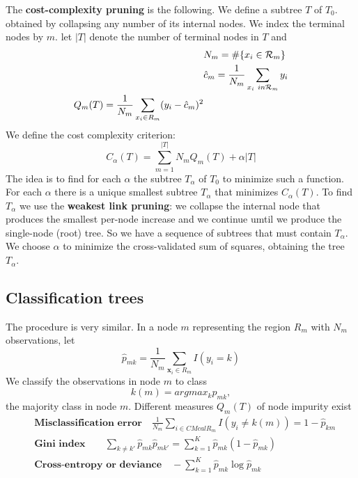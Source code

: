 \documentclass[12pt, letterpaper]{article}
\theoremstyle{definition}
\newcommand{\x}{\mathbf{x}}
\begin{document}
The \textbf{cost-complexity pruning} is the following. We define a subtree $T$ of $T_0$. obtained by collapsing any number of its internal nodes. We index the terminal nodes by $m$. let $|T|$ denote the number of terminal nodes in $T$ and 
\begin{equation}
\begin{aligned}
&N_m = \#\{x_i \in \CMcal{R}_m\}\\
&\hat{c}_m = \frac{1}{N_m} \sum_{x_i \ in \CMcal{R}_m} y_i\\
Q_m(T) = \frac{1}{N_m} \sum_{x_i \in R_m}(y_i - \hat{c}_m)^2
\end{aligned}
\end{equation} 
We define the cost complexity criterion:
\begin{equation}
C_\alpha (T) = \sum_{m=1}^{|T|} N_m Q_m(T) + \alpha |T|
\end{equation}
The idea is to find for each $\alpha$ the subtree $T_\alpha$ of $T_0$ to minimize such a function.
For each $\alpha$ there is a unique smallest subtree $T_\alpha$ that minimizes $C_\alpha(T)$. To find $T_\alpha$ we use the \textbf{weakest link pruning}: we collapse the internal node that produces the smallest per-node increase and we continue umtil we produce the single-node (root) tree. So we have a sequence of subtrees that must contain $T_\alpha$. We choose $\alpha$ to minimize the cross-validated sum of squares, obtaining the tree $T_\alpha$.

\subsection{Classification trees}
The procedure is very similar. In a node $m$ representing the region $R_m$ with $N_m$ observations, let 
\begin{equation}
\hat{p}_{mk} = \frac{1}{N_m}\sum_{\x_i\in R_m} I(y_i=k)
\end{equation}
We classify the observations in node $m$ to class
\begin{equation}
k(m) =argmax_k \hat{p}_{mk},
\end{equation}
the majority class in node $m$. Different measures $Q_m(T)$ of node impurity exist
\begin{equation}
\begin{aligned}
&\textbf{Misclassification error} \quad \frac{1}{N_m} \sum_{i\in CMcal{R}_m} I(y_i \ne k(m))=1-\hat{p}_{km}\\
&\textbf{Gini index} \quad\quad \sum_{k\ne k'} \hat{p}_{mk}\hat{p}_{mk'} = \sum_{k=1}^K \hat{p}_{mk}(1- \hat{p}_{mk})\\
&\textbf{Cross-entropy or deviance} \quad -\sum_{k=1}^K \hat{p}_{mk}\log \hat{p}_{mk}
\end{aligned}
\end{equation}
\end{document}
